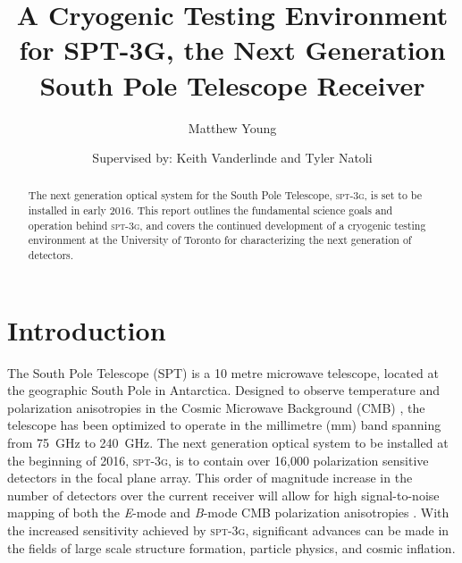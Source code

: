 \documentclass[iop]{emulateapj}
\begin{document}
\title{A Cryogenic Testing Environment for SPT-3G, the Next Generation South Pole Telescope Receiver}
\author{Matthew Young}
\author{Supervised by: Keith Vanderlinde and Tyler Natoli}

\begin{abstract}
The next generation optical system for the South Pole Telescope, \textsc{spt-3g}, is set to be installed in early 2016.  This report outlines the fundamental science goals and operation behind \textsc{spt-3g}, and covers the continued development of a cryogenic testing environment at the University of Toronto for characterizing the next generation of detectors.
\end{abstract}



\section{Introduction}

The South Pole Telescope (SPT) is a 10 metre microwave telescope, located at the geographic South Pole in Antarctica.  Designed to observe temperature and polarization anisotropies in the Cosmic Microwave Background (CMB) \citep{spt_collaboration_south_2004}, the telescope has been optimized to operate in the millimetre (mm) band spanning from 75~GHz to 240~GHz.
The next generation optical system to be installed at the beginning of 2016, \textsc{spt-3g}, is to contain over 16,000 polarization sensitive detectors in the focal plane array.  This order of magnitude increase in the number of detectors over the current receiver will allow for high signal-to-noise mapping of both the \textit{E}-mode and \textit{B}-mode CMB polarization anisotropies \citep{benson_spt-3g:_2014}. With the increased sensitivity achieved by \textsc{spt-3g}, significant advances can be made in the fields of large scale structure formation, particle physics, and cosmic inflation.
\end{document}
